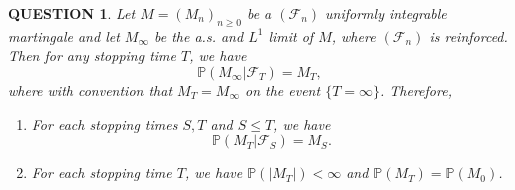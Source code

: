 \documentclass[12pt]{article}
\renewcommand{\(}{\left(}%
\renewcommand{\)}{\right)}%
\renewcommand{\[}{\left[}%
\renewcommand{\]}{\right]}%
\newcommand{\p}{\mathbb{P}}
\newcommand{\f}{\mathscr{F}}
\newtheorem{question}{QUESTION}[section]}
\begin{document}
  \begin{question}
   Let $M=(M_n)_{n\geq 0}$ be a $(\f_n)$ uniformly integrable martingale and let $M_\infty$ be the a.s. and $L^1$ limit of $M$, where $(\f_n)$ is reinforced. Then for any stopping time $T$, we have
   \begin{equation*}
    \p(M_\infty|\f_T )=M_T,
   \end{equation*}
   where with convention that $M_T=M_\infty$ on the event $\{T=\infty \}$. Therefore,
   \begin{enumerate}
    \item For each stopping times $S,T$ and $S\leq T$, we have
    \begin{equation*}
     \p(M_T|\f_S)=M_S.
    \end{equation*}
    \item For each stopping time $T$, we have $\p(|M_T|)<\infty$ and $\p(M_T)=\p(M_0)$.
   \end{enumerate}
  \end{question}
\end{document}
